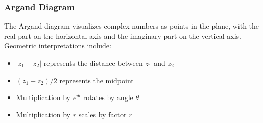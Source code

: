 \documentclass[12pt]{article}
\begin{document}
\subsubsection{Argand Diagram}

The Argand diagram visualizes complex numbers as points in the plane, with the real part on the horizontal axis and the imaginary part on the vertical axis. Geometric interpretations include:
\begin{itemize}[leftmargin=*]
  \item $|z_1 - z_2|$ represents the distance between $z_1$ and $z_2$
  \item $(z_1 + z_2)/2$ represents the midpoint
  \item Multiplication by $e^{i\theta}$ rotates by angle $\theta$
  \item Multiplication by $r$ scales by factor $r$
\end{itemize}
\end{document}
